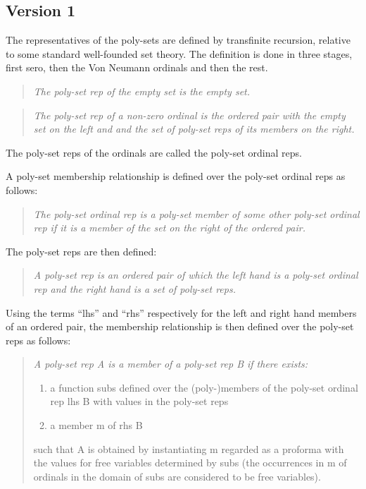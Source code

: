 \documentclass[numreferences]{rbjk}
\begin{document}
\begin{article}
\subsection{Version 1}

The representatives of the poly-sets are defined by transfinite recursion, relative to some standard well-founded set theory.
The definition is done in three stages, first sero, then the Von Neumann ordinals and then the rest.

\begin{quote}\label{def:poly-set rep}
{\it
The poly-set rep of the empty set is the empty set.
}
\end{quote}

\begin{quote}
\emph{
The poly-set rep of a non-zero ordinal is the ordered pair with the empty set on the left and and the set of poly-set reps of its members on the right.
}
\end{quote}

The poly-set reps of the ordinals are called the poly-set ordinal reps.

A poly-set membership relationship is defined over the poly-set ordinal reps as follows:

\begin{quote}
\emph{
The poly-set ordinal rep is a poly-set member of some other poly-set ordinal rep if it is a member of the set on the right of the ordered pair.
}
\end{quote}

The poly-set reps are then defined:

\begin{quote}
{\it
A poly-set rep is an ordered pair of which the left hand is a poly-set ordinal rep and the right hand is a set of poly-set reps.
}
\end{quote}

Using the terms ``lhs'' and ``rhs'' respectively for the left and right hand members of an ordered pair, the membership relationship is then defined over the poly-set reps as follows:

\begin{quotation}
{\it
A poly-set rep A is a member of a poly-set rep B if there exists:
\begin{enumerate}
\item a function \textsf{subs} defined over the (poly-)members of the poly-set ordinal rep \textsf{lhs B} with values in the poly-set reps
\item a member \textsf{m} of \textsf{rhs B}
\end{enumerate}
such that A is obtained by instantiating \textsf{m} regarded as a proforma with the values for free variables determined by \textsf{subs} (the occurrences in \textsf{m} of ordinals in the domain of \textsf{subs} are considered to be free variables).
}
\end{quotation}


\end{article}
\end{document}
